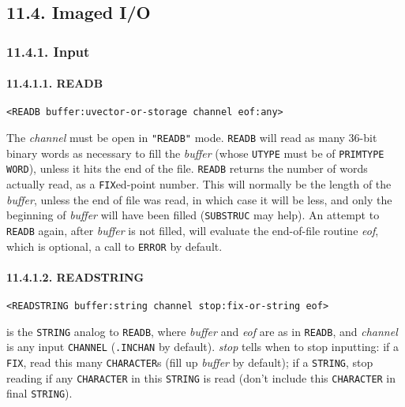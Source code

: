 \documentclass[a4paper,]{article}
\let\oldparagraph\paragraph
\renewcommand{\paragraph}[1]{\oldparagraph{#1}\mbox{}}
\begin{document}
\subsection{11.4. Imaged I/O}\label{imaged-io}

\subsubsection{11.4.1. Input}\label{input-1}

\paragraph{11.4.1.1. READB}\label{readb}

\begin{verbatim}
<READB buffer:uvector-or-storage channel eof:any>
\end{verbatim}

 The \emph{channel} must be open in \texttt{"READB"} mode. \texttt{READB} will read as many
36-bit binary words as necessary to fill the \emph{buffer} (whose \texttt{UTYPE} must be of \texttt{PRIMTYPE}
\texttt{WORD}), unless it hits the end of the file. \texttt{READB} returns the number of words actually read, as a
\texttt{FIX}ed-point number. This will normally be the length of the \emph{buffer}, unless the end of file was read, in
which case it will be less, and only the beginning of \emph{buffer} will have been filled (\texttt{SUBSTRUC} may help). An
attempt to \texttt{READB} again, after \emph{buffer} is not filled, will evaluate the end-of-file routine \emph{eof}, which
is optional, a call to \texttt{ERROR} by default.

\paragraph{11.4.1.2. READSTRING}\label{readstring}

\begin{verbatim}
<READSTRING buffer:string channel stop:fix-or-string eof>
\end{verbatim}

 is the \texttt{STRING} analog to \texttt{READB}, where \emph{buffer} and \emph{eof} are
as in \texttt{READB}, and \emph{channel} is any input \texttt{CHANNEL} (\texttt{.INCHAN} by default). \emph{stop} tells
when to stop inputting: if a \texttt{FIX}, read this many \texttt{CHARACTER}s (fill up \emph{buffer} by default); if a
\texttt{STRING}, stop reading if any \texttt{CHARACTER} in this \texttt{STRING} is read (don't include this
\texttt{CHARACTER} in final \texttt{STRING}).
\end{document}
